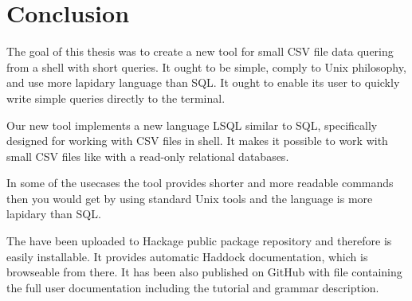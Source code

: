 \chapter*{Conclusion}

The goal of this thesis was to create a new tool for small CSV file data quering from a shell with short queries.
It ought to be simple, comply to Unix philosophy, and use more lapidary language than SQL.
It ought to enable its user to quickly write simple queries directly to the terminal.

Our new tool  implements a new language LSQL similar to
SQL, specifically designed for working with CSV files in shell. It makes it possible to work with small CSV files like with a read-only relational databases.

In some of the usecases the tool provides shorter and more readable commands then you would get by using standard Unix tools and the 
language is more lapidary than SQL.

The  have been uploaded to Hackage public package repository and therefore is easily installable. 
It provides automatic Haddock documentation, which is browseable from there. 
It has been also published on GitHub with  file containing the full user documentation including the tutorial and grammar description.

